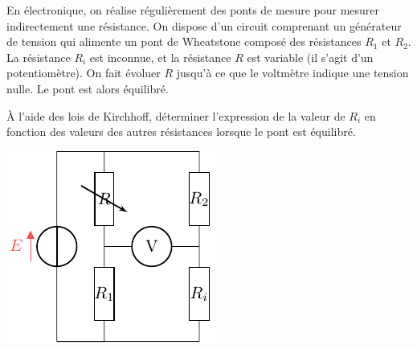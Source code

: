 \documentclass[../../main/main.tex]{subfiles}
\begin{document}
\noindent
\begin{minipage}{0.65\linewidth}
	En électronique, on réalise régulièrement des ponts de mesure pour mesurer
	indirectement une résistance. On dispose d'un circuit comprenant un
	générateur de tension qui alimente un pont de Wheatstone composé des
	résistances $R_1$ et $R_2$. La résistance $R_i$ est inconnue, et la
	résistance $R$ est variable (il s'agit d'un potentiomètre). On fait évoluer
	$R$ jusqu'à ce que le voltmètre indique une tension nulle. Le pont est alors
	équilibré. \bigbreak

	À l'aide des lois de Kirchhoff, déterminer l'expression de la valeur de
	$R_i$ en fonction des valeurs des autres résistances lorsque le pont est
	équilibré.
\end{minipage}
\hfill
\begin{minipage}{0.35\linewidth}
	\begin{center}
		\includegraphics[width=\linewidth]{wheatstone-plain}
	\end{center}
\end{minipage}
\end{document}

